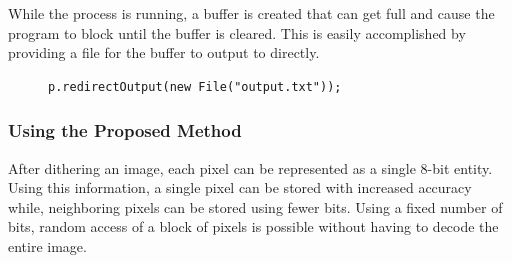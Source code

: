 \documentclass[12pt]{article}
\begin{document}
While the process is running, a buffer is created that can get full and cause the program to block until the buffer is cleared. This is easily accomplished by providing a file for the buffer to output to directly.

\begin{center}
\begin{figure}[!htbp]
\begin{verbatim}
p.redirectOutput(new File("output.txt"));
\end{verbatim}
\end{figure}
\end{center}

\subsubsection{Using the Proposed Method}
After dithering an image, each pixel can be represented as a single 8-bit entity. Using this information, a single pixel can be stored with increased accuracy while, neighboring pixels can be stored using fewer bits. Using a fixed number of bits, random access of a block of pixels is possible without having to decode the entire image.
\end{document}
